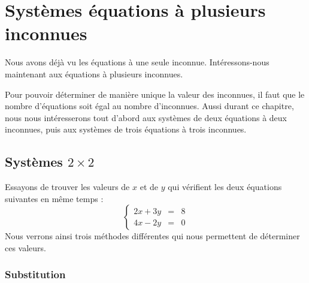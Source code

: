 \chapter[Systèmes d'équations]{Systèmes équations à plusieurs inconnues}



Nous avons déjà vu les équations à une seule inconnue. Intéressons-nous maintenant aux équations à plusieurs  inconnues.

Pour pouvoir déterminer de manière unique la valeur des inconnues, il faut que le nombre d'équations soit égal au nombre d'inconnues. Aussi durant ce chapitre, nous nous intéresserons  tout d'abord aux systèmes de deux équations à deux inconnues, puis aux systèmes de trois équations à trois inconnues.

\section{Systèmes $2\times 2$}

Essayons de trouver les valeurs de $x$ et de $y$ qui vérifient les deux équations suivantes en même temps :
$$
\left\{
\begin{array}{lll}
2x+3y &=& 8\\
4x-2y &=& 0
\end{array}
\right.
$$
Nous verrons ainsi trois méthodes différentes qui nous permettent de déterminer ces valeurs.

\subsection{Substitution}

